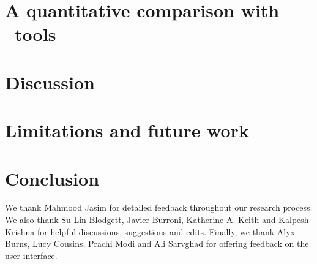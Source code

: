\documentclass[acmsmall,screen]{acmart}
\begin{document}
\section{A quantitative comparison with \Baselongname~tools}\label{s:crowdstudy}


\section{Discussion}\label{s:discussion}



\section{Limitations and future work}\label{s:limits_and_future}



\section{Conclusion}\label{s:conclusion_cc}


\begin{acks}
We thank Mahmood Jasim for detailed feedback throughout our research process.  We also thank Su Lin Blodgett, Javier Burroni, Katherine A. Keith and Kalpesh Krishna for helpful discussions, suggestions and edits. Finally, we thank Alyx Burns, Lucy Cousins, Prachi Modi and Ali Sarvghad for offering feedback on the user interface.
\end{acks}






%
\end{document}
